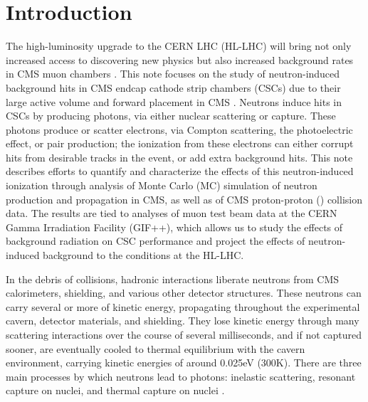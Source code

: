 \section{Introduction}
\label{sec:intro}
The high-luminosity upgrade to the CERN LHC (HL-LHC) will bring not only increased access to discovering new physics but also increased background rates in CMS muon chambers \cite{Evans:2008zzb,Apollinari:2116337}. This note focuses on the study of neutron-induced background hits in CMS endcap cathode strip chambers (CSCs) due to their large active volume and forward placement in CMS \cite{CMS:1997dma,Chatrchyan:2009hb}. Neutrons induce hits in CSCs by producing photons, via either nuclear scattering or capture. These photons produce or scatter electrons, via Compton scattering, the photoelectric effect, or pair production; the ionization from these electrons can either corrupt hits from desirable tracks in the event, or add extra background hits. This note describes efforts to quantify and characterize the effects of this neutron-induced ionization through analysis of Monte Carlo (MC) simulation of neutron production and propagation in CMS, as well as of CMS proton-proton (\pp) collision data. The results are tied to analyses of muon test beam data at the CERN Gamma Irradiation Facility (GIF++), which allows us to study the effects of background radiation on CSC performance and project the effects of neutron-induced background to the conditions at the HL-LHC.

In the debris of \pp collisions, hadronic interactions liberate neutrons from CMS calorimeters, shielding, and various other detector structures. These neutrons can carry several \GeVns or more of kinetic energy, propagating throughout the experimental cavern, detector materials, and shielding. They lose kinetic energy through many scattering interactions over the course of several milliseconds, and if not captured sooner, are eventually cooled to thermal equilibrium with the cavern environment, carrying kinetic energies of around 0.025\unit{eV} (300\unit{K}). There are three main processes by which neutrons lead to photons: inelastic scattering, resonant capture on nuclei, and thermal capture on nuclei \cite{Kopecky:1997}.

